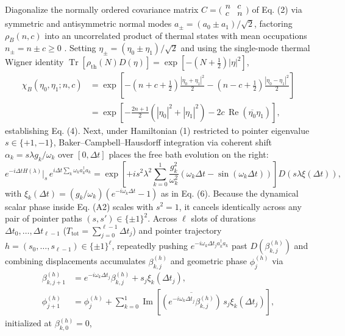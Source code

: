 \documentclass[11pt,letterpaper]{article}
\theoremstyle{definition}
\begin{document}
Diagonalize the normally ordered covariance matrix
\(C = \bigl(\begin{smallmatrix} n & c \\ c & n \end{smallmatrix}\bigr)\)
of Eq. (2) via symmetric and antisymmetric normal modes
\(a_\pm = (a_0 \pm a_1)/\sqrt{2}\), factoring \(\rho_B(n, c)\) into an
uncorrelated product of thermal states with mean occupations
\(n_\pm = n \pm c \ge 0\) \citep{weedbrook2012, serafini2017}. Setting
\(\eta_\pm = (\eta_0 \pm \eta_1)/\sqrt{2}\) and using the single-mode
thermal Wigner identity
\(\operatorname{Tr}[\rho_{\mathrm{th}}(N) D(\eta)] = \exp[-(N + \frac{1}{2})|\eta|^2]\),
\[\begin{aligned}
\chi_B(\eta_0, \eta_1; n, c) &= \exp\!\left[-\left(n + c + \frac{1}{2}\right)\frac{|\eta_0 + \eta_1|^2}{2} - \left(n - c + \frac{1}{2}\right)\frac{|\eta_0 - \eta_1|^2}{2}\right] \\
&= \exp\!\left[-\frac{2n+1}{2}\left(|\eta_0|^2 + |\eta_1|^2\right) - 2c\,\operatorname{Re}\!\left(\overline{\eta_0}\eta_1\right)\right],
\end{aligned}
\tag{A1}\] establishing Eq. (4). Next, under Hamiltonian (1) restricted
to pointer eigenvalue \(s \in \{+1, -1\}\), Baker--Campbell--Hausdorff
integration via coherent shift \(\alpha_k = s\lambda g_k/\omega_k\) over
\([0, \Delta t]\) places the free bath evolution on the right:
\[e^{-i\Delta t H(\lambda)}|_{s}\,e^{i\Delta t\sum_k \omega_k a_k^\dagger a_k} = \exp\!\left[+i s^2 \lambda^2 \sum_{k=0}^1 \frac{g_k^2}{\omega_k^2}\left(\omega_k \Delta t - \sin(\omega_k \Delta t)\right)\right] D\!\left(s \lambda \xi(\Delta t)\right),
\tag{A2}\] with
\(\xi_k(\Delta t) = (g_k/\omega_k)(e^{-i\omega_k \Delta t} - 1)\) as in
Eq. (6). Because the dynamical scalar phase inside Eq. (A2) scales with
\(s^2 = 1\), it cancels identically across any pair of pointer paths
\((s, s') \in \{\pm 1\}^2\). Across \(\ell\) slots of durations
\(\Delta t_0, \dots, \Delta t_{\ell-1}\)
(\(T_{\mathrm{tot}} = \sum_{j=0}^{\ell-1}\Delta t_j\)) and pointer
trajectory \(h = (s_0, \dots, s_{\ell-1}) \in \{\pm 1\}^\ell\),
repeatedly pushing \(e^{-i\omega_k \Delta t_j a_k^\dagger a_k}\) past
\(D(\beta_{k,j}^{(h)})\) and combining displacements accumulates
\(\beta_{k,j}^{(h)}\) and geometric phase \(\phi_{j}^{(h)}\) via
\[\begin{aligned}
\beta_{k,j+1}^{(h)} &= e^{-i\omega_k \Delta t_j}\beta_{k,j}^{(h)} + s_j \xi_k(\Delta t_j), \\
\phi_{j+1}^{(h)} &= \phi_{j}^{(h)} + \sum_{k=0}^{1} \operatorname{Im}\!\left[\overline{\left(e^{-i\omega_k \Delta t_j}\beta_{k,j}^{(h)}\right)}\,s_j \xi_k(\Delta t_j)\right],
\end{aligned}
\tag{A3}\] initialized at \(\beta_{k,0}^{(h)} = 0\),
\end{document}
